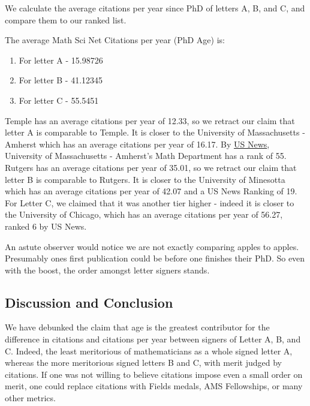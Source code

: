 \documentclass[]{article}
\begin{document}
We calculate the average citations per year since PhD of letters A, B,
and C, and compare them to our ranked list.

The average Math Sci Net Citations per year (PhD Age) is:

\begin{enumerate}
\def\labelenumi{\arabic{enumi}.}
\item
  For letter A - 15.98726
\item
  For letter B - 41.12345
\item
  For letter C - 55.5451
\end{enumerate}

Temple has an average citations per year of 12.33, so we retract our
claim that letter A is comparable to Temple. It is closer to the
University of Massachusetts - Amherst which has an average citations per
year of 16.17. By
\href{https://www.usnews.com/best-graduate-schools/top-science-schools/mathematics-rankings}{US
News}, University of Massachusetts - Amherst's Math Department has a
rank of 55. Rutgers has an average citations per year of 35.01, so we
retract our claim that letter B is comparable to Rutgers. It is closer
to the University of Minesotta which has an average citations per year
of 42.07 and a US News Ranking of 19. For Letter C, we claimed that it
was another tier higher - indeed it is closer to the University of
Chicago, which has an average citations per year of 56.27, ranked 6 by
US News.

An astute observer would notice we are not exactly comparing apples to
apples. Presumably ones first publication could be before one finishes
their PhD. So even with the boost, the order amongst letter signers
stands.

\hypertarget{discussion-and-conclusion}{%
\subsection{Discussion and Conclusion}\label{discussion-and-conclusion}}

We have debunked the claim that age is the greatest contributor for the
difference in citations and citations per year between signers of Letter
A, B, and C. Indeed, the least meritorious of mathematicians as a whole
signed letter A, whereas the more meritorious signed letters B and C,
with merit judged by citations. If one was not willing to believe
citations impose even a small order on merit, one could replace
citations with Fields medals, AMS Fellowships, or many other metrics.
\end{document}
